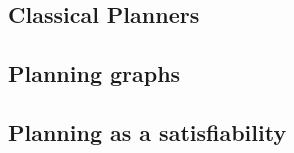 \documentclass[runningheads,a4paper]{llncs}
\begin{document}
%
%
%
%
%
%
%
%

\subsection{Classical Planners}

\subsection{Planning graphs}

\subsection{Planning as a satisfiability}
\end{document}
